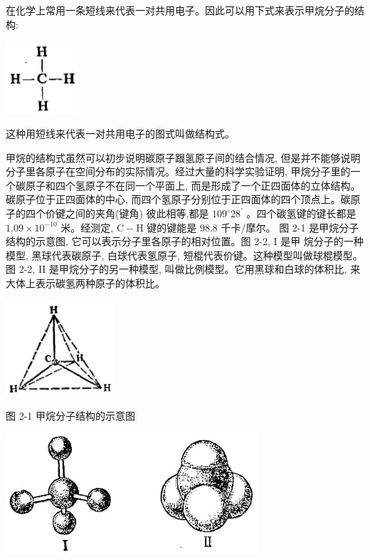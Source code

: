 \documentclass[10pt]{article}
\begin{document}
在化学上常用一条短线来代表一对共用电子。因此可以用下式来表示甲烷分子的结构:

\begin{center}
\includegraphics[max width=0.2\textwidth]{images/01912d16-be99-77bb-9535-4f3ed8d9946f_51_752139.jpg}
\end{center}

这种用短线来代表一对共用电子的图式叫做结构式。

甲烷的结构式虽然可以初步说明碳原子跟氢原子间的结合情况, 但是并不能够说明分子里各原子在空间分布的实际情况。经过大量的科学实验证明, 甲烷分子里的一个碳原子和四个氢原子不在同一个平面上, 而是形成了一个正四面体的立体结构。碳原子位于正四面体的中心, 而四个氢原子分别位于正四面体的四个顶点上。碳原子的四个价键之间的夹角(键角) 彼此相等,都是 \({109}^{ \circ }{28}^{\prime }\) 。四个碳氢键的键长都是 \({1.09} \times {10}^{-{10}}\) 米。经测定, \(\mathrm{C} - \mathrm{H}\) 键的键能是 98.8 千卡/摩尔。 图 2-1 是甲烷分子结构的示意图, 它可以表示分子里各原子的相对位置。图 2-2, I 是甲 烷分子的一种模型, 黑球代表碳原子, 白球代表氢原子, 短棍代表价键。这种模型叫做球棍模型。图 2-2, II 是甲烷分子的另一种模型, 叫做比例模型。它用黑球和白球的体积比, 来大体上表示碳氢两种原子的体积比。

\begin{center}
\includegraphics[max width=0.3\textwidth]{images/01912d16-be99-77bb-9535-4f3ed8d9946f_52_653943.jpg}
\end{center}

图 2-1 甲烷分子结构的示意图

\begin{center}
\includegraphics[max width=0.7\textwidth]{images/01912d16-be99-77bb-9535-4f3ed8d9946f_52_458146.jpg}
\end{center}
\end{document}
